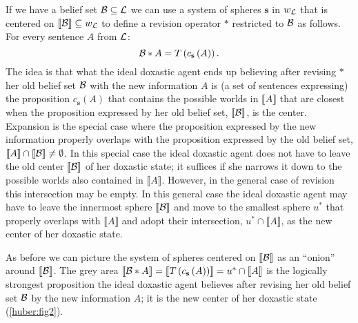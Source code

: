 If we have a belief set $\cal B\subseteq L$ we can use a system of spheres $\textbf{s}$ in $w_{\cal L}$ that is centered on $\llbracket\begin{cal}B\end{cal}\rrbracket\subseteq w_{\cal L}$ to define a revision operator $*$ restricted to $\cal B$ as follows. For every sentence $A$ from $\cal L$:
$$\begin{cal}B\end{cal}*A=T\left(c_{\textbf{s}}\left(A\right)\right).$$
The idea is that what the ideal doxastic agent ends up believing after revising $*$ her old belief set $\cal B$ with the new information $A$ is (a set of sentences expressing) the proposition $c_{\textbf{s}}\left(A\right)$ that contains the possible worlds in $\llbracket A\rrbracket$ that are closest when the proposition expressed by her old belief set, $\llbracket\cal B\rrbracket$, is the center. Expansion is the special case where the proposition expressed by the new information properly overlaps with the proposition expressed by the old belief set, $\llbracket A\rrbracket\cap\llbracket\cal B\rrbracket\neq\emptyset$. In this special case the ideal doxastic agent does not have to leave the old center $\llbracket\cal B\rrbracket$ of her doxastic state; it suffices if she narrows it down to the possible worlds also contained in $\llbracket A\rrbracket$. However, in the general case of revision this intersection may be empty. In this general case the ideal doxastic agent may have to leave the innermost sphere $\llbracket\cal B\rrbracket$ and move to the smallest sphere $u^*$ that properly overlaps with $\llbracket A\rrbracket$ and adopt their intersection, $u^*\cap\llbracket A\rrbracket$, as the new center of her doxastic state.

As before we can picture the system of spheres centered on $\llbracket\cal B\rrbracket$ as an ``onion'' around $\llbracket\cal B\rrbracket$. The grey area $\llbracket\begin{cal}B\end{cal}*A\rrbracket=\llbracket T\left(c_{\textbf{s}}\left(A\right)\right)\rrbracket=u^*\cap\llbracket A\rrbracket$ is the logically strongest proposition the ideal doxastic agent believes after revising her old belief set $\cal B$ by the new information $A$; it is the new center of her doxastic state (\autoref{huber:fig2}).

